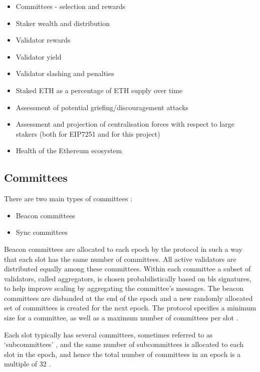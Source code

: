 \documentclass[UTF8]{article}
\begin{document}
\begin{itemize}
\item Committees - selection and rewards
\item Staker wealth and distribution
\item Validator rewards
\item Validator yield
\item Validator slashing and penalties
\item Staked ETH as a percentage of ETH supply over time
\item Assessment of potential griefing/discouragement attacks
\item Assessment and projection of centralisation forces with respect to large stakers (both for EIP7251 and for this project)
\item Health of the Ethereum ecosystem
\end{itemize}
\subsection{Committees}
\label{committee}
There are two main types of committees  \cite{Edgington2023}:

\begin{itemize}
\item Beacon committees
\item Sync committees
\end{itemize}

Beacon committees are allocated to each epoch by the protocol in such a way that each slot has the same number of committees. All active validators are distributed equally among these committees. Within each committee a subset of validators, called aggregators, is chosen probabilistically based on \gls{bls} signatures, to help improve scaling by aggregating the committee's messages. The beacon committees are disbanded at the end of the epoch and a new randomly allocated set of committees is created for the next epoch. The protocol specifies a minimum size for a committee, as well as a maximum number of committees per slot \cite{Edgington2023}.

Each slot typically has several committees, sometimes referred to as `subcommittees' \cite{Neuder2023b}, and the same number of subcommittees is allocated to each slot in the epoch, and hence the total number of committees in an epoch is a multiple of 32 \cite{Edgington2023}.
\end{document}
